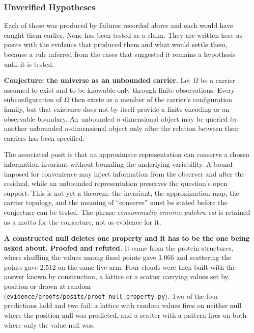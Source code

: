 \subsubsection{Unverified Hypotheses}

Each of these was produced by failures recorded above and each would have caught them earlier. None has been tested as a claim. They are written here as posits with the evidence that produced them and what would settle them, because a rule inferred from the cases that suggested it remains a hypothesis until it is tested.

\textbf{Conjecture: the universe as an unbounded carrier.} Let \(\Omega\) be a carrier assumed to exist and to be knowable only through finite observations. Every subconfiguration of \(\Omega\) then exists as a member of the carrier's configuration family, but that existence does not by itself provide a finite encoding or an observable boundary. An unbounded \(n\)-dimensional object may be queried by another unbounded \(n\)-dimensional object only after the relation between their carriers has been specified.

The associated posit is that an approximate representation can conserve a chosen information invariant without bounding the underlying variability. A bound imposed for convenience may inject information from the observer and alter the residual, while an unbounded representation preserves the question's open support. This is not yet a theorem: the invariant, the approximation map, the carrier topology, and the meaning of ``conserve'' must be stated before the conjecture can be tested. The phrase \emph{consummatio omnino pulchra est} is retained as a motto for the conjecture, not as evidence for it.

\textbf{A constructed null deletes one property and it has to be the one being asked about. Proofed and refuted.} It came from the protein structures, where shuffling the values among fixed points gave 1.066 and scattering the points gave 2.512 on the same live arm. Four clouds were then built with the answer known by construction, a lattice or a scatter carrying values set by position or drawn at random (\texttt{evidence/\allowbreak{}proofs/\allowbreak{}posits/\allowbreak{}proof\_\allowbreak{}null\_\allowbreak{}property.\allowbreak{}py}). Two of the four predictions hold and two fail: a lattice with random values fires on neither null where the position null was predicted, and a scatter with a pattern fires on both where only the value null was.

